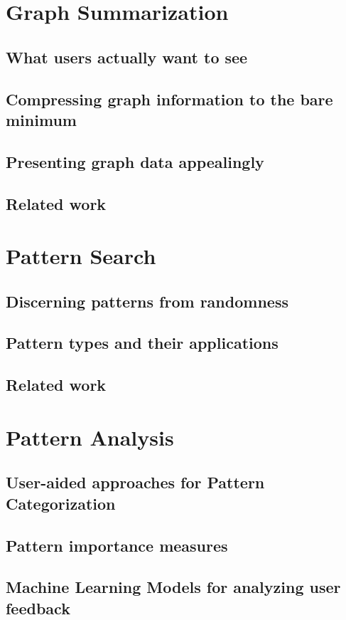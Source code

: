 \documentclass[
        a4paper,     %
        titlepage,   %
        oneside,     %
        parskip      %
        ]{scrartcl}  %
\begin{document}
  \section{Graph Summarization}
    \subsection{What users actually want to see}
    \subsection{Compressing graph information to the bare minimum}
    \subsection{Presenting graph data appealingly}
    \subsection{Related work}
    \pagebreak

  \section{Pattern Search}
    \subsection{Discerning patterns from randomness}
    \subsection{Pattern types and their applications}
    \subsection{Related work}
    \pagebreak

  \section{Pattern Analysis}
    \subsection{User-aided approaches for Pattern Categorization}
    \subsection{Pattern importance measures}
    \subsection{Machine Learning Models for analyzing user feedback}
\end{document}
